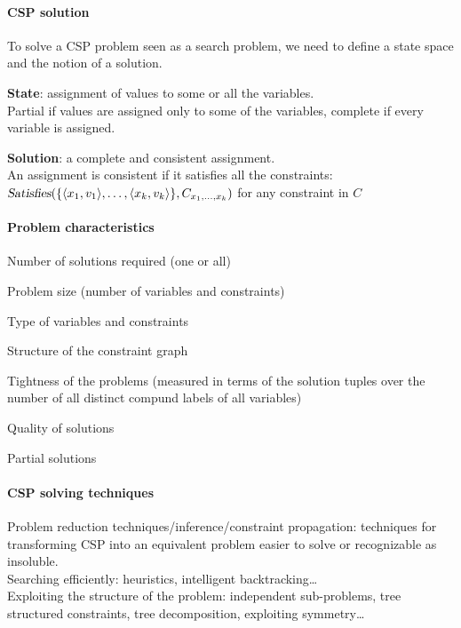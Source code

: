 \documentclass[10pt]{report}
\begin{document}
\paragraph{CSP solution} To solve a CSP problem seen as a search problem, we need to define a state space and the notion of a solution.
\begin{list}{}{}
	\item \textbf{State}: assignment of values to some or all the variables.\\
	Partial if values are assigned only to some of the variables, complete if every variable is assigned.
	\item \textbf{Solution}: a complete and consistent assignment.\\
	An assignment is consistent if it satisfies all the constraints: $\textsl{Satisfies}(\{\langle x_1,v_1\rangle, \ldots, \langle x_k, v_k\rangle\}, C_{x_1,\ldots, x_k})$ for any constraint in $C$
\end{list}
\paragraph{Problem characteristics} \begin{list}{}{}
	\item Number of solutions required (one or all)
	\item Problem size (number of variables and constraints)
	\item Type of variables and constraints
	\item Structure of the constraint graph
	\item Tightness of the problems (measured in terms of the solution tuples over the number of all distinct compund labels of all variables)
	\item Quality of solutions
	\item Partial solutions
\end{list}
\paragraph{CSP solving techniques} Problem reduction techniques/inference/constraint propagation: techniques for transforming CSP into an equivalent problem easier to solve or recognizable as insoluble.\\
Searching efficiently: heuristics, intelligent backtracking\ldots\\
Exploiting the structure of the problem: independent sub-problems, tree structured constraints, tree decomposition, exploiting symmetry\ldots
\end{document}
